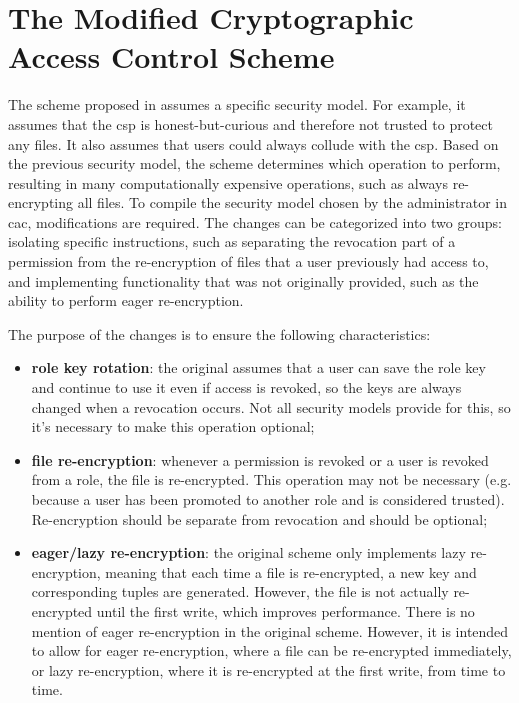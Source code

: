 \section{The Modified Cryptographic Access Control Scheme}
\label{sec:hybrid.cac}

The scheme proposed in \cite{cac} assumes a specific security model. For example, it assumes that the \gls{csp} is honest-but-curious and therefore not trusted to protect any files. It also assumes that users could always collude with the \gls{csp}. Based on the previous security model, the scheme determines which operation to perform, resulting in many computationally expensive operations, such as always re-encrypting all files. To compile the security model chosen by the administrator in \gls{cac}, modifications are required. The changes can be categorized into two groups: isolating specific instructions, such as separating the revocation part of a permission from the re-encryption of files that a user previously had access to, and implementing functionality that was not originally provided, such as the ability to perform eager re-encryption.

The purpose of the changes is to ensure the following characteristics:
\begin{itemize}
	\item \textbf{role key rotation}: the original \cacwhat assumes that a user can save the role key and continue to use it even if access is revoked, so the keys are always changed when a revocation occurs. Not all security models provide for this, so it's necessary to make this operation optional;
	
	\item \textbf{file re-encryption}: whenever a permission is revoked or a user is revoked from a role, the file is re-encrypted. This operation may not be necessary (e.g. because a user has been promoted to another role and is considered trusted). Re-encryption should be separate from revocation and should be optional;
	
	\item \textbf{eager/lazy re-encryption}: the original scheme only implements lazy re-encryption, meaning that each time a file is re-encrypted, a new key and corresponding tuples are generated. However, the file is not actually re-encrypted until the first write, which improves performance. There is no mention of eager re-encryption in the original scheme. However, it is intended to allow for eager re-encryption, where a file can be re-encrypted immediately, or lazy re-encryption, where it is re-encrypted at the first write, from time to time.
\end{itemize}


